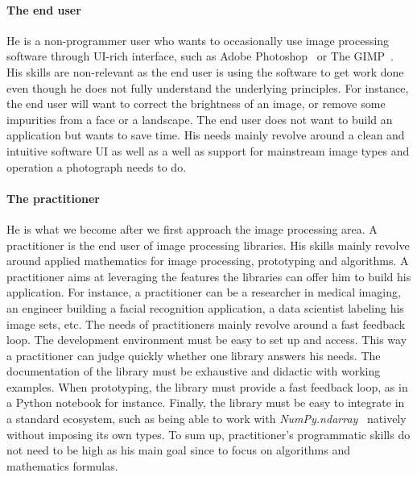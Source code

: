\paragraph{The end user} He is a non-programmer user who wants to occasionally use image processing software through
UI-rich interface, such as Adobe Photoshop~\parencite{adobe.2019.photoshop} or The GIMP~\parencite{gimp.2019}. His
skills are non-relevant as the end user is using the software to get work done even though he does not fully understand
the underlying principles. For instance, the end user will want to correct the brightness of an image, or remove some
impurities from a face or a landscape. The end user does not want to build an application but wants to save time. His
needs mainly revolve around a clean and intuitive software UI as well as a well as support for mainstream image types
and operation a photograph needs to do.

\paragraph{The practitioner} He is what we become after we first approach the image processing area. A practitioner is
the end user of image processing libraries. His skills mainly revolve around applied mathematics for image processing,
prototyping and algorithms. A practitioner aims at leveraging the features the libraries can offer him to build his
application. For instance, a practitioner can be a researcher in medical imaging, an engineer building a facial
recognition application, a data scientist labeling his image sets, etc. The needs of practitioners mainly revolve around
a fast feedback loop. The development environment must be easy to set up and access. This way a practitioner can judge
quickly whether one library answers his needs. The documentation of the library must be exhaustive and didactic with
working examples. When prototyping, the library must provide a fast feedback loop, as in a Python notebook for instance.
Finally, the library must be easy to integrate in a standard ecosystem, such as being able to work with
\emph{NumPy.ndarray}~\parencite{oram.2007.numpy,oliphant.2006.numpy,harris.2020.numpy} natively without imposing its own
types. To sum up, practitioner's programmatic skills do not need to be high as his main goal since to focus on
algorithms and mathematics formulas.

